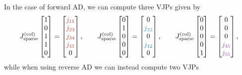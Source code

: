 In the case of forward AD, we can compute three VJPs given by 
\begin{equation}
    J^{(\text{col})}_{\text{sparse}} 
    \begin{bmatrix}
    1 \\ 0 \\ 1 \\ 1 \\ 0    
    \end{bmatrix}
    = 
    \begin{bmatrix}
    \color{myred}{j_{11}} \\ \color{myred}{j_{23}} \\ \color{myred}{j_{34}} \\ \color{myred}{j_{41}} \\ 0 \\   
    \end{bmatrix}, \qquad
    J^{(\text{col})}_{\text{sparse}} 
    \begin{bmatrix}
    0 \\ 1 \\ 0 \\ 0 \\ 0    
    \end{bmatrix}
    = 
    \begin{bmatrix}
    0 \\ \color{myblue}{j_{22}} \\ 0 \\ \color{myblue}{j_{42}} \\ 0 \\
    \end{bmatrix}, \qquad
    J^{(\text{col})}_{\text{sparse}} 
    \begin{bmatrix}
    0 \\ 0 \\ 0 \\ 0 \\ 1    
    \end{bmatrix}
    = 
    \begin{bmatrix}
    0 \\ 0 \\ 0 \\ \color{myviolet}{j_{45}} \\ \color{myviolet}{j_{55}} \\ 
    \end{bmatrix},
\end{equation}
while when using reverse AD we can instead compute two VJPs
